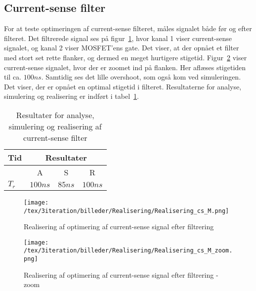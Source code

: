 
\subsection{Current-sense filter}
For at teste optimeringen af current-sense filteret, måles signalet både før og efter filteret. Det filtrerede signal ses på figur~\ref{fig:Realisering_cs_M_3}, hvor kanal 1 viser current-sense signalet, og kanal 2 viser MOSFET'ens gate. Det viser, at der opnået et filter med stort set rette flanker, og dermed en meget hurtigere stigetid. Figur~\ref{fig:Realisering_cs_M_zoom_3} viser current-sense signalet, hvor der er zoomet ind på flanken. Her aflæses stigetiden til ca. $100ns$. Samtidig ses det lille overshoot, som også kom ved simuleringen. Det viser, der er opnået en optimal stigetid i filteret. Resultaterne for analyse, simulering og realisering er indført i tabel~\ref{tab:resultat_cs_filter_3}.

\begin{table}[H] 			
	\centering
	\begin{tabularx}{\textwidth}{|X|c|c|c|}
		\hline
		\textbf{Tid} & \multicolumn{3}{|c|}{\textbf{Resultater}} 										\\ \hline
		& A & S & R 									\\ \hline
		$T_{r}$ & $100ns$ & $85ns$ & $100ns$ 										\\ \hline 
	\end{tabularx}
	\caption{Resultater for analyse, simulering og realisering af current-sense filter}
	\label{tab:resultat_cs_filter_3}
\end{table}


\begin{figure}[H]
	\center
	\texttt{[image: /tex/3iteration/billeder/Realisering/Realisering\_cs\_M.png]}
	\caption{Realisering af optimering af current-sense signal efter filtrering}
	\label{fig:Realisering_cs_M_3}
\end{figure}

\begin{figure}[H]
	\center
	\texttt{[image: /tex/3iteration/billeder/Realisering/Realisering\_cs\_M\_zoom.png]}
	\caption{Realisering af optimering af current-sense signal efter filtrering - zoom}
	\label{fig:Realisering_cs_M_zoom_3}
\end{figure}
